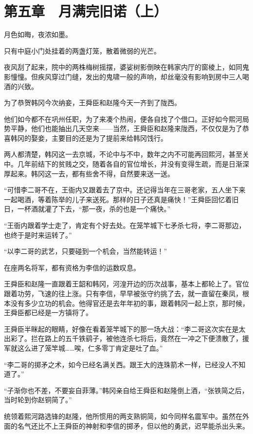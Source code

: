 \section{第五章　月满完旧诺（上）}

月色如晦，夜浓如墨。

只有中庭小门处挂着的两盏灯笼，散着微弱的光芒。

夜风刮了起来，院中的两株梅树摇摆，婆娑树影倒映在韩家内厅的窗棱上，如同鬼影憧憧。但疾风穿过门缝，发出的鬼啸一般的声响，却丝毫没有影响到房中三人喝酒的兴致。

为了恭贺韩冈今次纳妾，王舜臣和赵隆今天一齐到了陇西。

他们如今都不在巩州任职，为了来凑个热闹，便各自找了个借口。正好如今熙河局势平静，他们也能抽出几天空来——当然，王舜臣和赵隆来陇西，不仅仅是为了恭喜韩冈的娶妾，主要目的还是为了提前来给韩冈饯行。

两人都清楚，韩冈这一去京城，不论中与不中，数年之内不可能再回熙河，甚至关中。几年前结下的贫贱之交，随着各自的官位增长，并没有变得生疏，而是日渐深厚起来。韩冈这一去，都有些舍不得，自然要来送一送。

“可惜李二哥不在，王衙内又跟着去了京中。还记得当年在三哥老家，五人坐下来一起喝酒，等着陈举的儿子来送死。那样的日子还真是痛快！”王舜臣回忆着旧日，一杯酒就灌了下去，“那一夜，杀的也是一个痛快。”

“王衙内跟着学士走了，肯定有个好去处。在笼竿城下七矛杀七将，李二哥那边，也终于是时来运转了。”

“以李二哥的武艺，只要碰到一个机会，当然能转运！”

在座两名将军，都有资格为李信的运数叹息。

王舜臣和赵隆一直跟着王韶和韩冈，河湟开边的历次战事，基本上都轮上了。官位跟着功劳，飞速的往上涨。只有李信，早早被张守约挑了去，就一直留在秦凤，根本没有多少立功的机会。他得官还是去年年初的事，跟着韩冈一起上京，那时候，王舜臣都已经是一方镇将了。

王舜臣半眯起的眼睛，好像在看着笼竿城下的那一场大战：“李二哥这次实在是太出彩了。拦在路上的五千铁鹞子，被他连杀七将后，竟然在一冲之下便溃散了，援军就这么进了笼竿城……唉，仁多零丁肯定是吐了血。”

“李二哥的掷矛之术，如今已经名满关西。跟王大的连珠箭术一样，已经没人不知道了。”

“子渐你也不差，不要妄自菲薄。”韩冈亲自给王舜臣和赵隆倒上酒，“张铁简之后，当时轮到你赵铜简了。”

统领着熙河路选锋的赵隆，他所惯用的两支熟铜简，如今同样名震军中。虽然在外面的名气还比不上王舜臣的神射和李信的掷矛，但以他的勇武，迟早能杀出头来。

